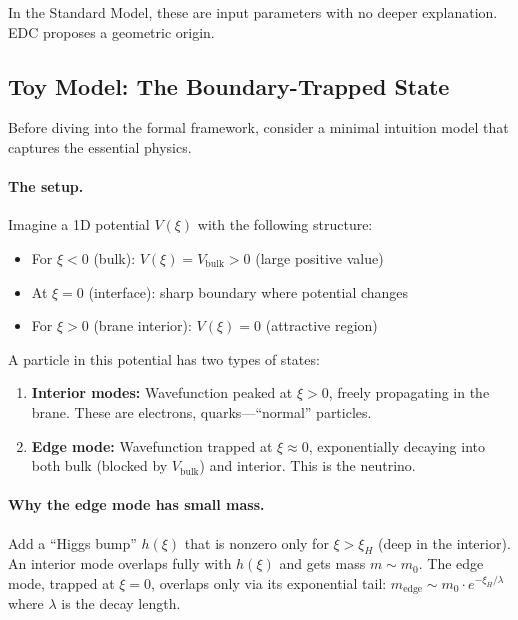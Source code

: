 In the Standard Model, these are input parameters with no deeper explanation.
EDC proposes a geometric origin.

\subsection{Toy Model: The Boundary-Trapped State}
\label{sec:ch6_toy_model}

Before diving into the formal framework, consider a minimal intuition model
that captures the essential physics.

\paragraph{The setup.}
Imagine a 1D potential $V(\xi)$ with the following structure:
\begin{itemize}[nosep]
    \item For $\xi < 0$ (bulk): $V(\xi) = V_{\text{bulk}} > 0$ (large positive value)
    \item At $\xi = 0$ (interface): sharp boundary where potential changes
    \item For $\xi > 0$ (brane interior): $V(\xi) = 0$ (attractive region)
\end{itemize}

A particle in this potential has two types of states:
\begin{enumerate}[nosep]
    \item \textbf{Interior modes:} Wavefunction peaked at $\xi > 0$, freely propagating
          in the brane. These are electrons, quarks---``normal'' particles.
    \item \textbf{Edge mode:} Wavefunction trapped at $\xi \approx 0$, exponentially
          decaying into both bulk (blocked by $V_{\text{bulk}}$) and interior.
          This is the neutrino.
\end{enumerate}

\paragraph{Why the edge mode has small mass.}
Add a ``Higgs bump'' $h(\xi)$ that is nonzero only for $\xi > \xi_H$ (deep in the interior).
An interior mode overlaps fully with $h(\xi)$ and gets mass $m \sim m_0$.
The edge mode, trapped at $\xi = 0$, overlaps only via its exponential tail:
$m_{\text{edge}} \sim m_0 \cdot e^{-\xi_H / \lambda}$ where $\lambda$ is the decay length.

